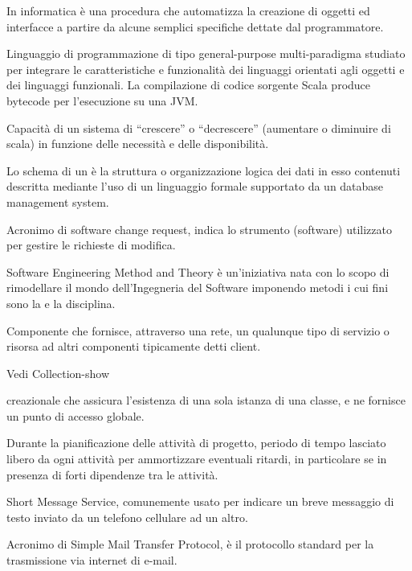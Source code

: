 
In informatica è una procedura che automatizza la creazione di oggetti ed interfacce a partire da alcune semplici specifiche dettate dal programmatore.

Linguaggio di programmazione di tipo general-purpose multi-paradigma studiato per integrare le caratteristiche e funzionalità dei linguaggi orientati agli oggetti e dei linguaggi funzionali. La compilazione di codice sorgente Scala produce  bytecode per l'esecuzione su una JVM.

Capacità di un sistema di ``crescere'' o ``decrescere'' (aumentare o diminuire di scala) in funzione delle necessità e delle disponibilità.

Lo schema di un  è la struttura o organizzazione logica dei dati in esso contenuti descritta mediante l'uso di un linguaggio formale supportato da un database management system.

Acronimo di software change request, indica lo strumento (software) utilizzato per gestire le richieste di modifica.

Software Engineering Method and Theory è un'iniziativa nata con lo scopo di rimodellare il mondo dell'Ingegneria del Software imponendo metodi i cui fini sono la  e la disciplina.

Componente che fornisce, attraverso una rete, un qualunque tipo di servizio o risorsa ad altri componenti tipicamente detti client.

Vedi Collection-show

 creazionale che assicura l'esistenza di una sola istanza di una classe, e ne fornisce un punto di accesso globale.

Durante la pianificazione delle attività di progetto, periodo di tempo lasciato libero da ogni attività per ammortizzare eventuali ritardi, in particolare se in presenza di forti dipendenze tra le attività.

Short Message Service, comunemente usato per indicare un breve messaggio di testo inviato da un telefono cellulare ad un altro.

Acronimo di Simple Mail Transfer Protocol, è il protocollo standard per la trasmissione via internet di e-mail.

